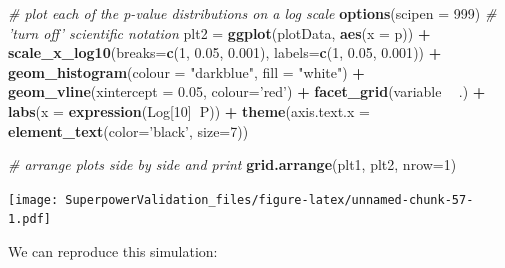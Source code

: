 \documentclass[]{book}
\newenvironment{Shaded}{\begin{snugshade}}{\end{snugshade}}
\newcommand{\CommentTok}[1]{\textcolor[rgb]{0.56,0.35,0.01}{\textit{#1}}}
\newcommand{\DataTypeTok}[1]{\textcolor[rgb]{0.13,0.29,0.53}{#1}}
\newcommand{\DecValTok}[1]{\textcolor[rgb]{0.00,0.00,0.81}{#1}}
\newcommand{\FloatTok}[1]{\textcolor[rgb]{0.00,0.00,0.81}{#1}}
\newcommand{\KeywordTok}[1]{\textcolor[rgb]{0.13,0.29,0.53}{\textbf{#1}}}
\newcommand{\NormalTok}[1]{#1}
\newcommand{\OperatorTok}[1]{\textcolor[rgb]{0.81,0.36,0.00}{\textbf{#1}}}
\newcommand{\StringTok}[1]{\textcolor[rgb]{0.31,0.60,0.02}{#1}}
\begin{document}
\begin{Shaded}
\begin{Highlighting}[]
\CommentTok{# plot each of the p-value distributions on a log scale}
\KeywordTok{options}\NormalTok{(}\DataTypeTok{scipen =} \DecValTok{999}\NormalTok{) }\CommentTok{# 'turn off' scientific notation}
\NormalTok{plt2 =}\StringTok{ }\KeywordTok{ggplot}\NormalTok{(plotData, }\KeywordTok{aes}\NormalTok{(}\DataTypeTok{x =}\NormalTok{ p)) }\OperatorTok{+}
\StringTok{    }\KeywordTok{scale_x_log10}\NormalTok{(}\DataTypeTok{breaks=}\KeywordTok{c}\NormalTok{(}\DecValTok{1}\NormalTok{, }\FloatTok{0.05}\NormalTok{, }\FloatTok{0.001}\NormalTok{), }
                  \DataTypeTok{labels=}\KeywordTok{c}\NormalTok{(}\DecValTok{1}\NormalTok{, }\FloatTok{0.05}\NormalTok{, }\FloatTok{0.001}\NormalTok{)) }\OperatorTok{+}
\StringTok{    }\KeywordTok{geom_histogram}\NormalTok{(}\DataTypeTok{colour =} \StringTok{"darkblue"}\NormalTok{, }\DataTypeTok{fill =} \StringTok{"white"}\NormalTok{) }\OperatorTok{+}
\StringTok{    }\KeywordTok{geom_vline}\NormalTok{(}\DataTypeTok{xintercept =} \FloatTok{0.05}\NormalTok{, }\DataTypeTok{colour=}\StringTok{'red'}\NormalTok{) }\OperatorTok{+}
\StringTok{    }\KeywordTok{facet_grid}\NormalTok{(variable }\OperatorTok{~}\StringTok{ }\NormalTok{.) }\OperatorTok{+}
\StringTok{    }\KeywordTok{labs}\NormalTok{(}\DataTypeTok{x =} \KeywordTok{expression}\NormalTok{(Log[}\DecValTok{10}\NormalTok{]}\OperatorTok{~}\NormalTok{P)) }\OperatorTok{+}
\StringTok{    }\KeywordTok{theme}\NormalTok{(}\DataTypeTok{axis.text.x =} \KeywordTok{element_text}\NormalTok{(}\DataTypeTok{color=}\StringTok{'black'}\NormalTok{, }\DataTypeTok{size=}\DecValTok{7}\NormalTok{))}
 
\CommentTok{# arrange plots side by side and print}
\KeywordTok{grid.arrange}\NormalTok{(plt1, plt2, }\DataTypeTok{nrow=}\DecValTok{1}\NormalTok{)}
\end{Highlighting}
\end{Shaded}

\texttt{[image: SuperpowerValidation\_files/figure-latex/unnamed-chunk-57-1.pdf]}

We can reproduce this simulation:
\end{document}

